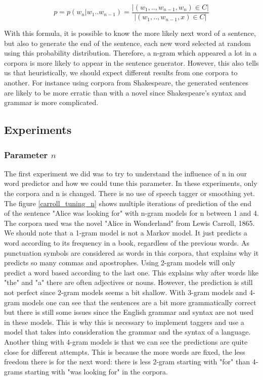\documentclass[a4paper,12pt]{article}
\begin{document}
$$ p = p(w_n | w_1 .. w_{n-1}) = \frac{|{(w_1, .., w_{n-1}, w_n) \in C}|}{|{(w_1, .., w_{n-1}, x) \in C}|} $$

With this formula, it is possible to know the more likely next word of a sentence, but also to generate the end of the sentence, each new word selected at random using this probability distribution. Therefore, a n-gram which appeared a lot in a corpora is more likely to appear in the sentence generator. However, this also tells us that heuristically, we should expect different results from one corpora to another. For instance using corpora from Shakespeare, the generated sentences are likely to be more erratic than with a novel since Shakespeare's syntax and grammar is more complicated.

\subsection{Experiments}
\subsubsection{Parameter $n$}
	The first experiment we did was to try to understand the influence of n in our word predictor and how we could tune this parameter. In these experiments, only the corpora and n is changed. There is no use of speech tagger or smoothing yet. The figure \ref{carroll_tuning_n} shows multiple iterations of prediction of the end of the sentence "Alice was looking for" with n-gram models for n between 1 and 4. The corpora used was the novel "Alice in Wonderland" from Lewis Carroll, 1865. 
	We should note that a 1-gram model is not a Markov model. It just predicts a word according to its frequency in a book, regardless of the previous words. As punctuation symbols are considered as words in this corpora, that explains why it predicts so many commas and apostrophes. 
	Using 2-gram models will only predict a word based according to the last one. This explains why after words like "the" and "a" there are often adjectives or nouns. However, the prediction is still not perfect since 2-gram models seems a bit shallow.
	With 3-gram models and 4-gram models one can see that the sentences are a bit more grammatically correct but there is still some issues since the English grammar and syntax are not used in these models. This is why this is necessary to implement taggers and use a model that takes into consideration the grammar and the syntax of a language. Another thing with 4-gram models is that we can see the predictions are quite close for different attempts. This is because the more words are fixed, the less freedom there is for the next word: there is less 2-gram starting with "for" than 4-grams starting with "was looking for" in the corpora.
	
\end{document}
